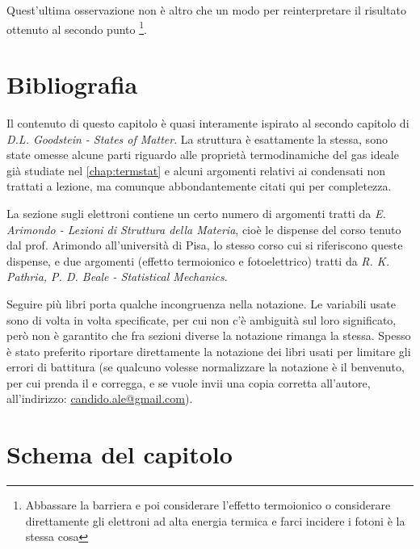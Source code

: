 Quest'ultima osservazione non è altro che un modo per reinterpretare il risultato ottenuto al secondo punto \footnote{Abbassare la barriera e poi considerare l'effetto termoionico o considerare direttamente gli elettroni ad alta energia termica e farci incidere i fotoni è la stessa cosa}.


\section{Bibliografia}

Il contenuto di questo capitolo è quasi interamente ispirato al secondo capitolo di \textit{D.L. Goodstein - States of Matter}. La struttura è esattamente la stessa, sono state omesse alcune parti riguardo alle proprietà termodinamiche del gas ideale già studiate nel \cref{chap:termstat} e alcuni argomenti relativi ai condensati non trattati a lezione, ma comunque abbondantemente citati qui per completezza.

La sezione sugli elettroni contiene un certo numero di argomenti tratti da \textit{E. Arimondo - Lezioni di Struttura della Materia}, cioè le dispense del corso tenuto dal prof. Arimondo all'università di Pisa, lo stesso corso cui si riferiscono queste dispense, e due argomenti (effetto termoionico e fotoelettrico) tratti da \textit{R. K. Pathria, P. D. Beale - Statistical Mechanics}.

Seguire più libri porta qualche incongruenza nella notazione. Le variabili usate sono di volta in volta specificate, per cui non c'è ambiguità sul loro significato, però non è garantito che fra sezioni diverse la notazione rimanga la stessa. Spesso è stato preferito riportare direttamente la notazione dei libri usati per limitare gli errori di battitura (se qualcuno volesse normalizzare la notazione è il benvenuto, per cui prenda il  e corregga, e se vuole invii una copia corretta all'autore, all'indirizzo: \href{mailto:candido.ale@gmail.com}{candido.ale@gmail.com}).

\vfill

\pagebreak

\section{Schema del capitolo}


